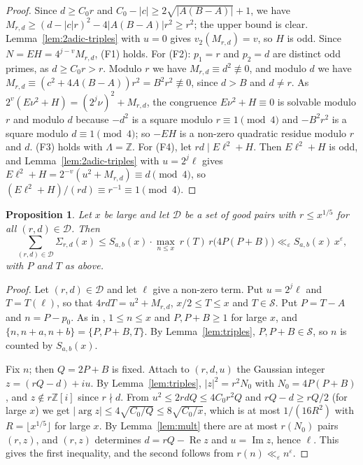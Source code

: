\documentclass[11pt]{amsart}
\newtheorem{proposition}[theorem]{Proposition}
\theoremstyle{remark}
\theoremstyle{definition}
\numberwithin{equation}{section}
\newcommand{\Sc}{\mathcal{S}}
\newcommand{\Dc}{\mathcal{D}}
\newcommand{\Z}{\mathbb{Z}}
\newcommand{\eps}{\varepsilon}
\newcommand{\Zi}{\Z[i]}
\begin{document}
\begin{proof}
Since $d\ge C_0r$ and $C_0-|c|\ge2\sqrt{|A(B-A)|}+1$, we have $M_{r,d}\ge(d-|c|r)^2-4|A(B-A)|r^2\ge r^2$; the upper bound is clear. Lemma~\ref{lem:2adic-triples} with $u=0$ gives $v_2(M_{r,d})=v$, so $H$ is odd. Since $N=EH=4^{j-v}M_{r,d}$, (F1) holds. For (F2): $p_1=r$ and $p_2=d$ are distinct odd primes, as $d\ge C_0r>r$. Modulo $r$ we have $M_{r,d}\equiv d^2\not\equiv0$, and modulo $d$ we have $M_{r,d}\equiv(c^2+4A(B-A))r^2=B^2r^2\not\equiv0$, since $d>B$ and $d\ne r$. As $2^v(E\nu^2+H)=(2^j\nu)^2+M_{r,d}$, the congruence $E\nu^2+H\equiv0$ is solvable modulo $r$ and modulo $d$ because $-d^2$ is a square modulo $r\equiv1\pmod4$ and $-B^2r^2$ is a square modulo $d\equiv1\pmod4$; so $-EH$ is a non-zero quadratic residue modulo $r$ and $d$. (F3) holds with $\Lambda=\Z$. For (F4), let $rd\mid E\ell^2+H$. Then $E\ell^2+H$ is odd, and Lemma~\ref{lem:2adic-triples} with $u=2^j\ell$ gives $E\ell^2+H=2^{-v}(u^2+M_{r,d})\equiv d\pmod4$, so $(E\ell^2+H)/(rd)\equiv r^{-1}\equiv1\pmod4$.
\end{proof}

\begin{proposition}\label{prop:reduction-triples}
Let $x$ be large and let $\Dc$ be a set of good pairs with $r\le x^{1/5}$ for all $(r,d)\in\Dc$. Then
\[
\sum_{(r,d)\in\Dc}\Sigma_{r,d}(x)\le S_{a,b}(x)\cdot\max_{n\le x}\ r(T)\,r\bigl(4P(P+B)\bigr)\ll_\eps S_{a,b}(x)\,x^{\eps},
\]
with $P$ and $T$ as above.
\end{proposition}

\begin{proof}
Let $(r,d)\in\Dc$ and let $\ell$ give a non-zero term. Put $u=2^j\ell$ and $T=T(\ell)$, so that $4rdT=u^2+M_{r,d}$, $x/2\le T\le x$ and $T\in\Sc$. Put $P=T-A$ and $n=P-p_0$. As in \cite[Proposition~4.2]{IC}, $1\le n\le x$ and $P,P+B\ge1$ for large $x$, and $\{n,n+a,n+b\}=\{P,P+B,T\}$. By Lemma~\ref{lem:triples}, $P,P+B\in\Sc$, so $n$ is counted by $S_{a,b}(x)$.

Fix $n$; then $Q=2P+B$ is fixed. Attach to $(r,d,u)$ the Gaussian integer $z=(rQ-d)+iu$. By Lemma~\ref{lem:triples}, $|z|^2=r^2N_0$ with $N_0=4P(P+B)$, and $z\notin r\Zi$ since $r\nmid d$. From $u^2\le2rdQ\le4C_0r^2Q$ and $rQ-d\ge rQ/2$ (for large $x$) we get $|\arg z|\le4\sqrt{C_0/Q}\le8\sqrt{C_0/x}$, which is at most $1/(16R^2)$ with $R=\lfloor x^{1/5}\rfloor$ for large $x$. By Lemma~\ref{lem:mult} there are at most $r(N_0)$ pairs $(r,z)$, and $(r,z)$ determines $d=rQ-\operatorname{Re}z$ and $u=\operatorname{Im}z$, hence $\ell$. This gives the first inequality, and the second follows from $r(n)\ll_\eps n^\eps$.
\end{proof}
\end{document}
